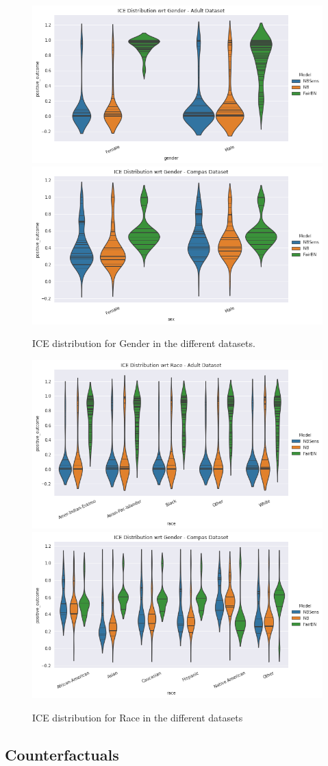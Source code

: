 \begin{figure}
    \centering
    \includegraphics[width=0.49\linewidth]{figures/ICEdistgender-adult.png}
    \includegraphics[width=0.49\linewidth]{figures/ICEdistgender-compas.png}
    \caption{ICE distribution for Gender in the different datasets.}
    \label{fig:ICEdistgender}
\end{figure}

\begin{figure}
    \centering
    \includegraphics[width=0.49\linewidth]{figures/ICEdistrace-adult.png}
    \includegraphics[width=0.49\linewidth]{figures/ICEdistrace-compas.png}
    \caption{ICE distribution for Race in the different datasets}
    \label{fig:ICEdistrace}
\end{figure}


\subsection{Counterfactuals}


